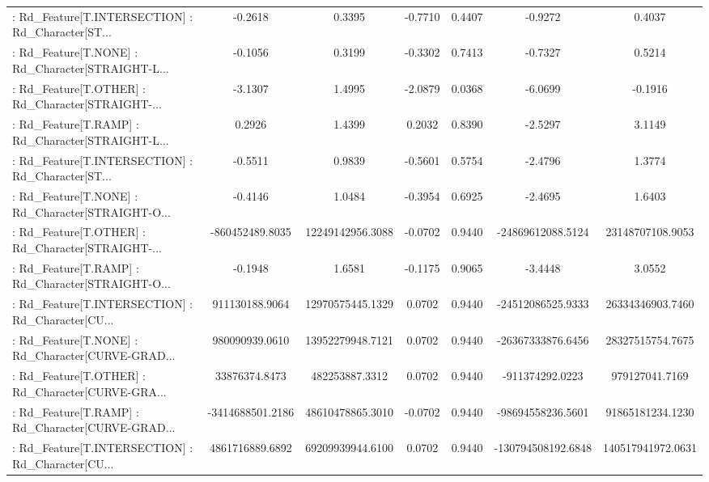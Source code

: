 \begin{longtable}{p{4cm}cccccc}
 : Rd\_Feature[T.INTERSECTION] : Rd\_Character[ST... &           -0.2618 &            0.3395 & -0.7710 &       0.4407 &            -0.9272 &            0.4037 \\
 : Rd\_Feature[T.NONE] : Rd\_Character[STRAIGHT-L... &           -0.1056 &            0.3199 & -0.3302 &       0.7413 &            -0.7327 &            0.5214 \\
 : Rd\_Feature[T.OTHER] : Rd\_Character[STRAIGHT-... &           -3.1307 &            1.4995 & -2.0879 &       0.0368 &            -6.0699 &           -0.1916 \\
 : Rd\_Feature[T.RAMP] : Rd\_Character[STRAIGHT-L... &            0.2926 &            1.4399 &  0.2032 &       0.8390 &            -2.5297 &            3.1149 \\
 : Rd\_Feature[T.INTERSECTION] : Rd\_Character[ST... &           -0.5511 &            0.9839 & -0.5601 &       0.5754 &            -2.4796 &            1.3774 \\
 : Rd\_Feature[T.NONE] : Rd\_Character[STRAIGHT-O... &           -0.4146 &            1.0484 & -0.3954 &       0.6925 &            -2.4695 &            1.6403 \\
 : Rd\_Feature[T.OTHER] : Rd\_Character[STRAIGHT-... &   -860452489.8035 &  12249142956.3088 & -0.0702 &       0.9440 &  -24869612088.5124 &  23148707108.9053 \\
 : Rd\_Feature[T.RAMP] : Rd\_Character[STRAIGHT-O... &           -0.1948 &            1.6581 & -0.1175 &       0.9065 &            -3.4448 &            3.0552 \\
 : Rd\_Feature[T.INTERSECTION] : Rd\_Character[CU... &    911130188.9064 &  12970575445.1329 &  0.0702 &       0.9440 &  -24512086525.9333 &  26334346903.7460 \\
 : Rd\_Feature[T.NONE] : Rd\_Character[CURVE-GRAD... &    980090939.0610 &  13952279948.7121 &  0.0702 &       0.9440 &  -26367333876.6456 &  28327515754.7675 \\
 : Rd\_Feature[T.OTHER] : Rd\_Character[CURVE-GRA... &     33876374.8473 &    482253887.3312 &  0.0702 &       0.9440 &    -911374292.0223 &    979127041.7169 \\
 : Rd\_Feature[T.RAMP] : Rd\_Character[CURVE-GRAD... &  -3414688501.2186 &  48610478865.3010 & -0.0702 &       0.9440 &  -98694558236.5601 &  91865181234.1230 \\
 : Rd\_Feature[T.INTERSECTION] : Rd\_Character[CU... &   4861716889.6892 &  69209939944.6100 &  0.0702 &       0.9440 & -130794508192.6848 & 140517941972.0631 \\

\end{longtable}
